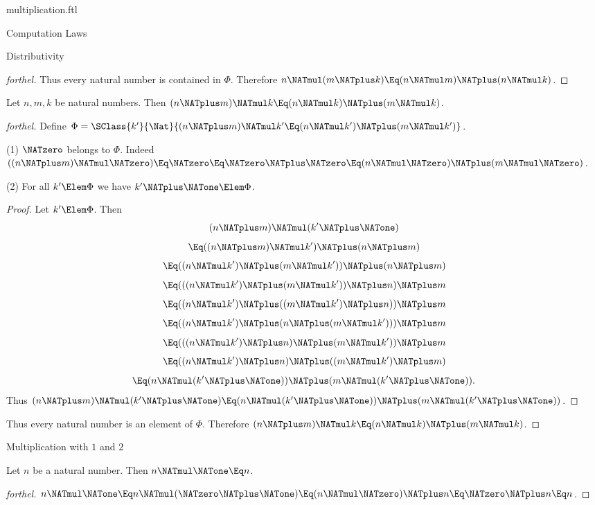 \documentclass{stex}
\begin{document}
\begin{smodule}{multiplication.ftl}
\begin{sfragment}{Computation Laws}
\begin{sfragment}{Distributivity}
\begin{proof}[forthel]
      Thus every natural number is contained in $\Phi$.
      Therefore $n \NATmul (m \NATplus k) \Eq (n \NATmul m) \NATplus (n \NATmul k)$.
    \end{proof}

    \begin{proposition}[forthel,id=ARITHMETIC_06_5742967566368768]
      Let $n, m, k$ be natural numbers.
      Then $(n \NATplus m) \NATmul k \Eq (n \NATmul k) \NATplus (m \NATmul k)$.
    \end{proposition}
    \begin{proof}[forthel]
      Define $\Phi = \SClass{k'}{\Nat}{(n \NATplus m) \NATmul k' \Eq (n \NATmul k') \NATplus (m \NATmul k')}$.

      (1) $\NATzero$ belongs to $\Phi$.
      Indeed $((n \NATplus m) \NATmul \NATzero)
        \Eq \NATzero
        \Eq \NATzero \NATplus \NATzero
        \Eq (n \NATmul \NATzero) \NATplus (m \NATmul \NATzero)$.

      (2) For all $k' \Elem \Phi$ we have $k' \NATplus \NATone \Elem \Phi$.
      \begin{proof}
        Let $k' \Elem \Phi$.
        Then
        \[  (n \NATplus m) \NATmul (k' \NATplus \NATone)                        \]
        \[    \Eq ((n \NATplus m) \NATmul k') \NATplus (n \NATplus m)              \]
        \[    \Eq ((n \NATmul k') \NATplus (m \NATmul k')) \NATplus (n \NATplus m)   \]
        \[    \Eq (((n \NATmul k') \NATplus (m \NATmul k')) \NATplus n) \NATplus m   \]
        \[    \Eq ((n \NATmul k') \NATplus ((m \NATmul k') \NATplus n)) \NATplus m   \]
        \[    \Eq ((n \NATmul k') \NATplus (n \NATplus (m \NATmul k'))) \NATplus m   \]
        \[    \Eq (((n \NATmul k') \NATplus n) \NATplus (m \NATmul k')) \NATplus m   \]
        \[    \Eq ((n \NATmul k') \NATplus n) \NATplus ((m \NATmul k') \NATplus m)   \]
        \[    \Eq (n \NATmul (k' \NATplus \NATone)) \NATplus (m \NATmul (k' \NATplus \NATone)).  \]
        Thus $(n \NATplus m) \NATmul (k' \NATplus \NATone) \Eq (n \NATmul (k' \NATplus \NATone)) \NATplus (m \NATmul (k' \NATplus \NATone))$.
      \end{proof}

      Thus every natural number is an element of $\Phi$.
      Therefore $(n \NATplus m) \NATmul k \Eq (n \NATmul k) \NATplus (m \NATmul k)$.
    \end{proof}
  \end{sfragment}

  \begin{sfragment}{Multiplication with $1$ and $2$}
    \begin{proposition}[forthel,id=ARITHMETIC_06_2910559821365248]
      Let $n$ be a natural number.
      Then $n \NATmul \NATone \Eq n$.
    \end{proposition}
    \begin{proof}[forthel]
      $n \NATmul \NATone
        \Eq n \NATmul (\NATzero \NATplus \NATone)
        \Eq (n \NATmul \NATzero) \NATplus n
        \Eq \NATzero \NATplus n
        \Eq n$.
    \end{proof}


\end{sfragment}
\end{sfragment}
\end{smodule}
\end{document}
